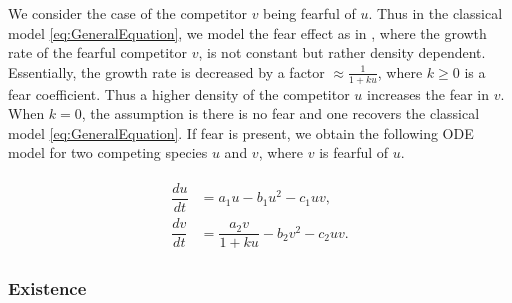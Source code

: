 \documentclass[10pt]{amsart}
\newtheorem{theorem}{Theorem}[section]
\theoremstyle{definition}
\begin{document}
We consider the case of the competitor $v$ being fearful of $u$. Thus in the classical model \eqref{eq:GeneralEquation}, we model the fear effect as in \cite{Wang16}, where the growth rate of the fearful competitor $v$, is not constant but rather density dependent. Essentially, the growth rate
is decreased by a factor $\approx \frac{1}{1+k u}$, where $k \geq 0$ is a fear coefficient. Thus a higher density of the competitor $u$ increases the fear in $v$. When $k=0$, the assumption is there is no fear and one recovers the classical model \eqref{eq:GeneralEquation}. If fear is present, we obtain the following ODE model for two competing species $u$ and $v$, where $v$ is fearful of $u$.

\begin{align}\label{eq:ODE2}
	\begin{split}
		\dfrac{du}{dt} &= a_1 u -b_1 u^2 -c_1 uv, \\
		\dfrac{dv}{dt} &=  \dfrac{a_2 v}{1+ku}  -b_2 v^2 -c_2 uv.
	\end{split}
\end{align}

\subsubsection{Existence}


%	
\end{document}
